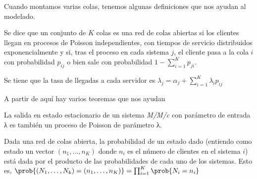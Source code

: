 Cuando montamos varias colas, tenemos algunas definiciones que nos ayudan al modelado.

\begin{defn} Se dice que un conjunto de $K$ colas es una red de colas abiertas si los clientes llegan en procesos de Poisson independientes, con tiempos de servicio distribuidos exponencialmente y si, tras el proceso en cada sistema $j$, el cliente pasa a la cola $i$ con probabilidad $p_{ij}$ o bien sale con probabilidad $1 - \sum_{i=1}^K p_{ji}$.
\end{defn}

Se tiene que la tasa de llegadas a cada servidor es \( λ_j = α_j + \sum_{i=1}^K λ_i p_{ij} \)

A partir de aquí hay varios teoremas que nos ayudan

\begin{theorem} La salida en estado estacionario de un sistema \textit{M/M/c} con parámetro de entrada λ es también un proceso de Poisson de parámetro λ.
\end{theorem}

\begin{theorem} Dada una red de colas abierta, la probabilidad de un estado dado (entiendo como estado un vector $(n_1, \dotsc, n_K)$ donde $n_i$ es el número de clientes en el sistema $i$) está dada por el producto de las probabilidades de cada uno de los sistemas. Esto es, \(\prob{(N_1, \dotsc, N_k) = (n_1, \dotsc, n_K)} = \prod_{i=1}^K \prob{N_i = n_i} \)
\end{theorem}
